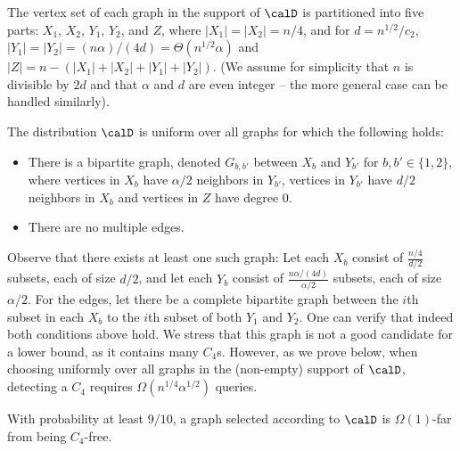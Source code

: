 The vertex set of each graph in the support of $\calD$ is partitioned into five parts: $X_1$, $X_2$, $Y_1$, $Y_2$, and $Z$, where $|X_1| = |X_2|=n/4$, and for $d = n^{1/2}/c_2$,  $|Y_1| = |Y_2| = (n\alpha)/(4 d) = \Theta(n^{1/2}\alpha)$ and $|Z| = n - (|X_1|+|X_2|+|Y_1|+|Y_2|)$. (We assume for simplicity that $n$ is divisible by $2d$
and that $\alpha$ and $d$ are even integer -- the more general case can be handled similarly). %


The distribution $\calD$ is uniform over all graphs for which the following holds:
\begin{itemize}
\item There is a bipartite graph, denoted $G_{b,b'}$ between $X_b$ and $Y_{b'}$ for $b,b' \in \{1,2\}$, where vertices in $X_b$ have  $\alpha/2$ neighbors in $Y_{b'}$, vertices in $Y_{b'}$ have $d/2$ neighbors in $X_b$ and vertices in $Z$ have degree $0$.
\item There are no multiple edges.
\end{itemize}
 Observe that there exists at least one such graph: Let each $X_b$  consist of $\frac{n/4}{d/2}$ subsets, each of size $d/2$, and let each $Y_b$ consist of $\frac{n\alpha/(4d)}{\alpha/2}$ subsets, each of size $\alpha/2$. For the edges, let there be a complete bipartite graph between the $i$th subset in each $X_b$ to the $i$th subset of both $Y_1$ and $Y_2$. One can verify that indeed both conditions above hold. We stress that this graph is not a good candidate for a lower bound, as it contains many $C_4$s. However, as we prove below, when choosing uniformly over all graphs in the (non-empty) support of $\calD$, detecting a $C_4$ requires $\Omega(n^{1/4}\alpha^{1/2})$ queries.


 \begin{lemma}\label{lem:D-C4-far}
With probability at least $9/10$, a graph selected according to $\calD$ is $\Omega(1)$-far from being $C_4$-free.
\end{lemma}

